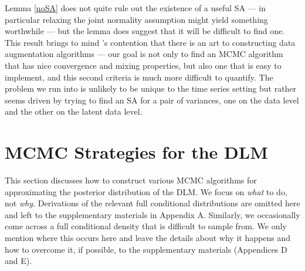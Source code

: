 \documentclass[12pt]{article}
\begin{document}
Lemma \ref{noSA} does not quite rule out the existence of a useful SA --- in particular relaxing the joint normality assumption might yield something worthwhile --- but the lemma does suggest that it will be difficult to find one. This result brings to mind \citet{van2001art}'s contention that there is an art to constructing data augmentation algorithms --- our goal is not only to find an MCMC algorithm that has nice convergence and mixing properties, but also one that is easy to implement, and this second criteria is much more difficult to quantify. The problem we run into is unlikely to be unique to the time series setting but rather seems driven by trying to find an SA for a pair of variances, one on the data level and the other on the latent data level.

\section{MCMC Strategies for the DLM}\label{sec:Algs}

This section discusses how to construct various MCMC algorithms for approximating the posterior distribution of the DLM. We focus on {\it what} to do, not {\it why}. Derivations of the relevant full conditional distributions are omitted here and left to the supplementary materials in Appendix A. Similarly, we occasionally come across a full conditional density that is difficult to sample from. We only mention where this occurs here and leave the details about why it happens and how to overcome it, if possible, to the supplementary materials (Appendices D and E).
\end{document}
